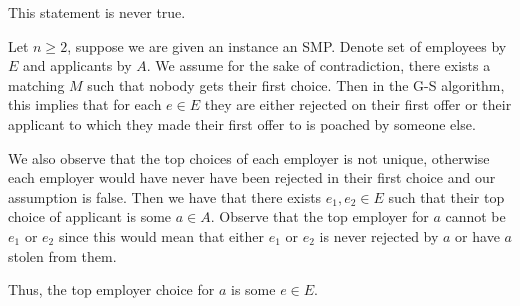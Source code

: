 \documentclass[11pt,fleqn]{exam}
\newenvironment{soln}{\color{solnblue}}{}
\newif\ifsolutions\solutionsfalse
\begin{document}

\ifsolutions\else\newpage\fi



\begin{soln}
	This statement is never true.

	Let \(n \geq 2\), suppose we are given an instance an SMP. Denote set of employees by \(E\) and applicants by \(A\).
	We assume for the sake of contradiction, there exists a matching \(M\) such that nobody gets their first choice.
	Then in the G-S algorithm, this implies that for each \(e \in E\) they are either rejected on their first offer or
	their applicant to which they made their first offer to is poached by someone else.

	We also observe that the top choices of each employer is not unique, otherwise each employer would have never have been rejected in their first choice and our assumption is false.
	Then we have that there exists \(e_1, e_2 \in E\) such that their top choice of applicant is some \(a \in A\).
	Observe that the top employer for \(a\) cannot be \(e_1\) or \(e_2\) since this would mean that either \(e_1\) or \(e_2\) is never rejected by \(a\) or have \(a\) stolen from them.

	Thus, the top employer choice for \(a\) is some \(e \in E\).



\end{soln}


\ifsolutions\else\newpage\fi


\ifsolutions\else\newpage\fi
\end{document}
